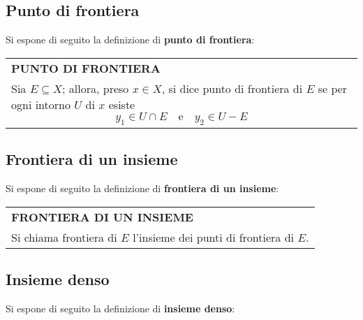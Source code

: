 \documentclass[a4paper]{extarticle}
\renewcommand\arraystretch{}
\begin{document}
\vspace{1em}
\noindent
\subsection{Punto di frontiera}
Si espone di seguito la definizione di \textbf{punto di frontiera}:

\vspace{1em}
\setlength{\tabcolsep}{14pt}
\renewcommand{\arraystretch}{2}
\noindent
\begin{tabularx}{\textwidth}{@{}|P|@{}}
    \hline
    {\textbf{PUNTO DI FRONTIERA}}\\
    \parbox{\linewidth}{Sia $E \subseteq X$; allora, preso $x \in X$, si dice punto di frontiera di $E$ se per ogni intorno $U$ di $x$ esiste
    \[y_1 \in U \cap E \hspace{1em} \text{e} \hspace{1em} y_2 \in U - E\]
    \vspace{-1mm}}\\
    \hline
\end{tabularx}

\vspace{1em}
\noindent
\subsection{Frontiera di un insieme}
Si espone di seguito la definizione di \textbf{frontiera di un insieme}:

\vspace{1em}
\setlength{\tabcolsep}{14pt}
\renewcommand{\arraystretch}{2}
\noindent
\begin{tabularx}{\textwidth}{@{}|P|@{}}
    \hline
    {\textbf{FRONTIERA DI UN INSIEME}}\\
    \parbox{\linewidth}{Si chiama frontiera di $E$ l'insieme dei punti di frontiera di $E$.
    \vspace{3mm}}\\
    \hline
\end{tabularx}


\vspace{1em}
\noindent
\subsection{Insieme denso}
Si espone di seguito la definizione di \textbf{insieme denso}:
\end{document}
